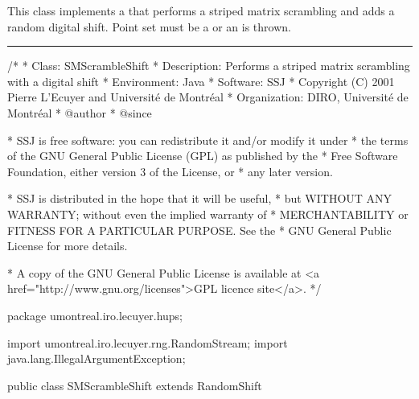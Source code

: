 
This class implements a
that performs a striped matrix scrambling and adds a random
digital shift. Point set must be a
 or an
 is thrown.

\bigskip\hrule\bigskip

\begin{code}
\begin{hide}
/*
 * Class:        SMScrambleShift
 * Description:  Performs a striped matrix scrambling with a digital shift
 * Environment:  Java
 * Software:     SSJ 
 * Copyright (C) 2001  Pierre L'Ecuyer and Université de Montréal
 * Organization: DIRO, Université de Montréal
 * @author       
 * @since

 * SSJ is free software: you can redistribute it and/or modify it under
 * the terms of the GNU General Public License (GPL) as published by the
 * Free Software Foundation, either version 3 of the License, or
 * any later version.

 * SSJ is distributed in the hope that it will be useful,
 * but WITHOUT ANY WARRANTY; without even the implied warranty of
 * MERCHANTABILITY or FITNESS FOR A PARTICULAR PURPOSE.  See the
 * GNU General Public License for more details.

 * A copy of the GNU General Public License is available at
   <a href="http://www.gnu.org/licenses">GPL licence site</a>.
 */
\end{hide}
package umontreal.iro.lecuyer.hups;
\begin{hide}
 import umontreal.iro.lecuyer.rng.RandomStream;
 import java.lang.IllegalArgumentException;
\end{hide}

public class SMScrambleShift extends RandomShift \begin{hide} {
\end{hide}
\end{code}

